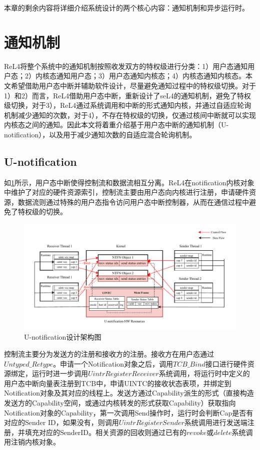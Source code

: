 本章的剩余内容将详细介绍系统设计的两个核心内容：通知机制和异步运行时。
\section{通知机制}

ReL4将整个系统中的通知机制按照收发双方的特权级进行分类：1）用户态通知用户态；2）内核态通知用户态；3）用户态通知内核态；4）内核态通知内核态。本文希望借助用户态中断并辅助软件设计，尽量避免通知过程中的特权级切换。对于1）和2）而言，ReL4借助用户态中断，重新设计了seL4的通知机制，避免了特权级切换，对于3），ReL4通过系统调用和中断的形式通知内核，并通过自适应轮询机制减少通知的次数，对于4），不存在特权级的切换，仅通过核间中断就可以实现内核态之间的通知。因此本文将着重介绍基于用户态中断的通知机制（U-notification），以及用于减少通知次数的自适应混合轮询机制。

\subsection{U-notification}
如\ref{fig:u-notification}所示，用户态中断使得控制流和数据流相互分离。ReL4在notification内核对象中维护了对应的硬件资源索引，控制流主要由用户态向内核进行注册，申请硬件资源，数据流则通过特殊的用户态指令访问用户态中断控制器，从而在通信过程中避免了特权级的切换。

\begin{figure}[htbp]
  \centering
  \includegraphics[width=1.0\textwidth]{figures/uintr_for_ntfn.drawio.pdf}
  \caption{U-notification设计架构图}\label{fig:u-notification}
\end{figure}

控制流主要分为发送方的注册和接收方的注册。接收方在用户态通过$Untyped\_Retype$。申请一个Notification对象之后，调用$TCB\_Bind$接口进行硬件资源绑定，运行时进一步调用$UintrRegisterReceiver$系统调用，将运行时中定义的用户态中断向量表注册到TCB中，申请UINTC的接收状态表项，并绑定到Notification对象及其对应的线程上。发送方通过Capability派生的形式（直接构造发送方的Capability空间，或通过内核转发的形式获取Capability）获取指向Notification对象的Capability，第一次调用Send操作时，运行时会判断Cap是否有对应的Sender ID，如果没有，则调用$UintrRegisterSender$系统调用进行发送端注册，并填充对应的SenderID。相关资源的回收则通过已有的$revoke$或$delete$系统调用注销内核对象。

